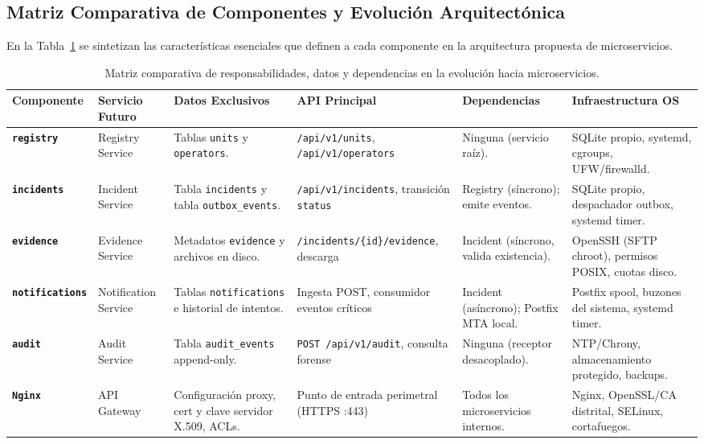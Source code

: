 \documentclass[10pt,a4paper]{article}
\begin{document}
\subsection{Matriz Comparativa de Componentes y Evolución Arquitectónica}

En la Tabla~\ref{tab:microservicios_comparativa} se sintetizan las características esenciales que definen a cada componente en la arquitectura propuesta de microservicios.

\begin{table}[H]
    \centering
    \scriptsize
    \caption{Matriz comparativa de responsabilidades, datos y dependencias en la evolución hacia microservicios.}
    \label{tab:microservicios_comparativa}
    \begin{tabularx}{\textwidth}{l p{2.2cm} p{2.5cm} p{2.8cm} p{2.2cm} X}
        \toprule
        \rowcolor{tableheader}
        \textbf{Componente} & \textbf{Servicio Futuro} & \textbf{Datos Exclusivos} & \textbf{API Principal} & \textbf{Dependencias} & \textbf{Infraestructura OS} \\
        \midrule
        \textbf{\texttt{registry}} & Registry Service & Tablas \texttt{units} y \texttt{operators}. & \texttt{/api/v1/units}, \texttt{/api/v1/operators} & Ninguna (servicio raíz). & SQLite propio, systemd, cgroups, UFW/firewalld. \\
        \rowcolor{rowalt}
        \textbf{\texttt{incidents}} & Incident Service & Tabla \texttt{incidents} y tabla \texttt{outbox\_events}. & \texttt{/api/v1/incidents}, transición \texttt{status} & Registry (síncrono); emite eventos. & SQLite propio, despachador outbox, systemd timer. \\
        \textbf{\texttt{evidence}} & Evidence Service & Metadatos \texttt{evidence} y archivos en disco. & \texttt{/incidents/\{id\}/}\allowbreak\texttt{evidence}, descarga & Incident (síncrono, valida existencia). & OpenSSH (SFTP chroot), permisos POSIX, cuotas disco. \\
        \rowcolor{rowalt}
        \textbf{\texttt{notifications}} & Notification Service & Tablas \texttt{notifications} e historial de intentos. & Ingesta POST, consumidor eventos críticos & Incident (asíncrono); Postfix MTA local. & Postfix spool, buzones del sistema, systemd timer. \\
        \textbf{\texttt{audit}} & Audit Service & Tabla \texttt{audit\_events} append-only. & \texttt{POST /api/v1/audit}, consulta forense & Ninguna (receptor desacoplado). & NTP/Chrony, almacenamiento protegido, backups. \\
        \rowcolor{rowalt}
        \textbf{\texttt{Nginx}} & API Gateway & Configuración proxy, cert y clave servidor X.509, ACLs. & Punto de entrada perimetral (HTTPS :443) & Todos los microservicios internos. & Nginx, OpenSSL/CA distrital, SELinux, cortafuegos. \\
        \bottomrule
    \end{tabularx}
\end{table}
\end{document}
